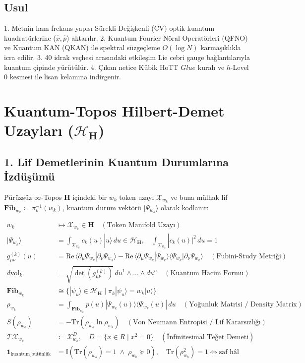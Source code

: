 \documentclass[11pt, a4paper]{article}
\begin{document}
\subsection{Usul}
1. Metnin ham frekans yapısı Sürekli Değişkenli (CV) optik kuantum kuadratürlerine ($\hat{x}, \hat{p}$) aktarılır.
2. Kuantum Fourier Nöral Operatörleri (QFNO) ve Kuantum KAN (QKAN) ile spektral süzgeçleme $O(\log N)$ karmaşıklıkla icra edilir.
3. 40 idrak veçhesi arasındaki etkileşim Lie cebri gauge bağlantılarıyla kuantum çipinde yürütülür.
4. Çıkan netice Kübik HoTT $Glue$ kuralı ve $h$-Level 0 kesmesi ile lisan kelamına indirgenir.

\section{Kuantum-Topos Hilbert-Demet Uzayları ($\mathcal{H}_{\mathbf{H}}$)}

\subsection{1. Lif Demetlerinin Kuantum Durumlarına İzdüşümü}
Pürüzsüz $\infty$-Topos $\mathbf{H}$ içindeki bir $w_k$ token uzayı $\mathcal{X}_{w_k}$ ve buna mülhak lif $\mathbf{Fib}_{w_k} \coloneqq \pi_k^{-1}(w_k)$, kuantum durum vektörü $|\Psi_{w_k}\rangle$ olarak kodlanır:

\begin{align}
w_k &\longmapsto \mathcal{X}_{w_k} \in \mathbf{H} \quad (\text{Token Manifold Uzayı}) \\
|\Psi_{w_k}\rangle &= \int_{\mathcal{X}_{w_k}} c_k(u) |u\rangle \, du \in \mathcal{H}_{\mathbf{H}}, \quad \int_{\mathcal{X}_{w_k}} |c_k(u)|^2 \, du = 1 \\
g_{\mu\nu}^{(k)}(u) &= \mathrm{Re}\,\langle \partial_\mu \Psi_{w_k} | \partial_\nu \Psi_{w_k} \rangle - \mathrm{Re}\,\langle \partial_\mu \Psi_{w_k} | \Psi_{w_k} \rangle \langle \Psi_{w_k} | \partial_\nu \Psi_{w_k} \rangle \quad (\text{Fubini-Study Metriği}) \\
d\text{vol}_k &= \sqrt{\det(g_{\mu\nu}^{(k)})} \, du^1 \wedge \dots \wedge du^n \quad (\text{Kuantum Hacim Formu}) \\
\mathbf{Fib}_{w_k} &\cong \{ |\psi_u\rangle \in \mathcal{H}_{\mathbf{H}} \mid \hat{\pi}_k |\psi_u\rangle = w_k |u\rangle \} \\
\rho_{w_k} &= \int_{\mathbf{Fib}_{w_k}} p(u) |\Psi_{w_k}(u)\rangle \langle \Psi_{w_k}(u)| \, du \quad (\text{Yoğunluk Matrisi / Density Matrix}) \\
S(\rho_{w_k}) &= -\text{Tr}(\rho_{w_k} \ln \rho_{w_k}) \quad (\text{Von Neumann Entropisi / Lif Kararsızlığı}) \\
\mathcal{T}\mathcal{X}_{w_k} &\coloneqq \mathcal{X}_{w_k}^D, \quad D = \{x \in R \mid x^2 = 0\} \quad (\text{İnfinitesimal Teğet Demeti}) \\
\mathbf{1}_{\text{kuantum\_bütünlük}} &= \mathbb{I}\left( \text{Tr}(\rho_{w_k}) = 1 \;\wedge\; \rho_{w_k} \succeq 0 \right), \quad \text{Tr}(\rho_{w_k}^2) = 1 \iff \text{saf hâl}
\end{align}
\end{document}
